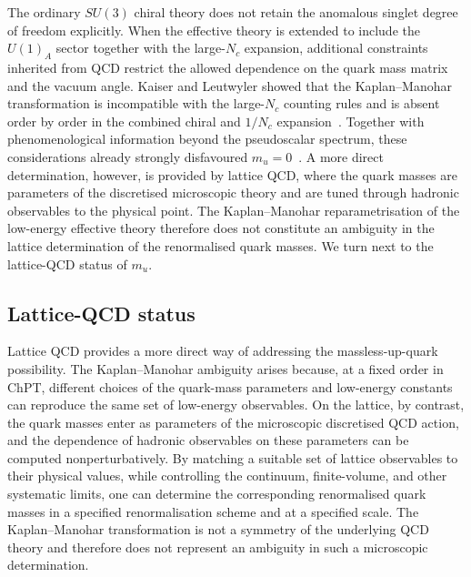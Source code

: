 \documentclass[review]{elsarticle}
\numberwithin{equation}{section}
\numberwithin{table}{section}
\numberwithin{figure}{section}
\begin{document}
The ordinary $SU(3)$ chiral theory does not retain the anomalous singlet degree of freedom explicitly. When the effective theory is extended to include the $U(1)_A$ sector together with the large-$N_c$ expansion, additional constraints inherited from QCD restrict the allowed dependence on the quark mass matrix and the vacuum angle. Kaiser and Leutwyler showed that the Kaplan--Manohar transformation is incompatible with the large-$N_c$ counting rules and is absent order by order in the combined chiral and $1/N_c$ expansion~\cite{Kaiser:2000gs}. Together with phenomenological information beyond the pseudoscalar spectrum, these considerations already strongly disfavoured $m_u=0$~\cite{Leutwyler:1996qg}. A more direct determination, however, is provided by lattice QCD, where the quark masses are parameters of the discretised microscopic theory and are tuned through hadronic observables to the physical point. The Kaplan--Manohar reparametrisation of the low-energy effective theory therefore does not constitute an ambiguity in the lattice determination of the renormalised quark masses. We turn next to the lattice-QCD status of $m_u$.

\subsection{Lattice-QCD status}
\label{sec:massless-up-lattice}

Lattice QCD provides a more direct way of addressing the massless-up-quark possibility. The Kaplan--Manohar ambiguity arises because, at a fixed order in ChPT, different choices of the quark-mass parameters and low-energy constants can reproduce the same set of low-energy observables. On the lattice, by contrast, the quark masses enter as parameters of the microscopic discretised QCD action, and the dependence of hadronic observables on these parameters can be computed nonperturbatively. By matching a suitable set of lattice observables to their physical values, while controlling the continuum, finite-volume, and other systematic limits, one can determine the corresponding renormalised quark masses in a specified renormalisation scheme and at a specified scale. The Kaplan--Manohar transformation is not a symmetry of the underlying QCD theory and therefore does not represent an ambiguity in such a microscopic determination.
\end{document}
